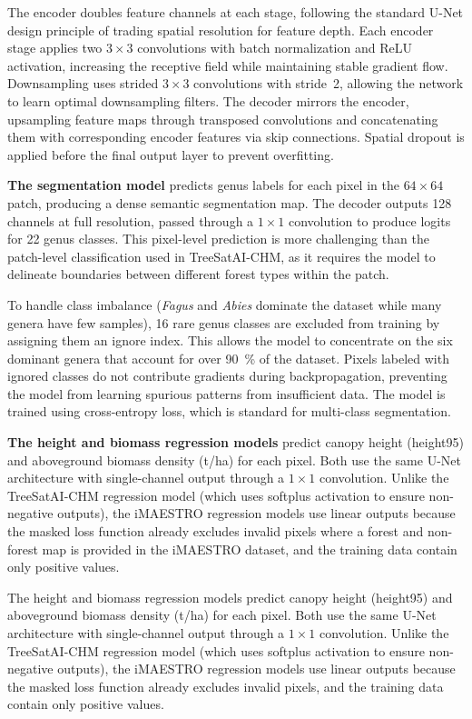 The encoder doubles feature channels at each stage, following the standard U-Net design principle of trading spatial resolution for feature depth. Each encoder stage applies two $3\times 3$ convolutions with batch normalization and ReLU activation, increasing the receptive field while maintaining stable gradient flow. Downsampling uses strided $3\times 3$ convolutions with stride~2, allowing the network to learn optimal downsampling filters. The decoder mirrors the encoder, upsampling feature maps through transposed convolutions and concatenating them with corresponding encoder features via skip connections. Spatial dropout is applied before the final output layer to prevent overfitting.

\textbf{The segmentation model} predicts genus labels for each pixel in the $64\times 64$ patch, producing a dense semantic segmentation map. The decoder outputs 128 channels at full resolution, passed through a $1\times 1$ convolution to produce logits for 22 genus classes. This pixel-level prediction is more challenging than the patch-level classification used in TreeSatAI-CHM, as it requires the model to delineate boundaries between different forest types within the patch.

To handle class imbalance (\textit{Fagus} and \textit{Abies} dominate the dataset while many genera have few samples), 16 rare genus classes are excluded from training by assigning them an ignore index. This allows the model to concentrate on the six dominant genera that account for over \SI{90}{\percent} of the dataset. Pixels labeled with ignored classes do not contribute gradients during backpropagation, preventing the model from learning spurious patterns from insufficient data. The model is trained using cross-entropy loss, which is standard for multi-class segmentation.

\textbf{The height and biomass regression models} predict canopy height (height95) and aboveground biomass density (t/ha) for each pixel. Both use the same U-Net architecture with single-channel output through a $1\times 1$ convolution. Unlike the TreeSatAI-CHM regression model (which uses softplus activation to ensure non-negative outputs), the iMAESTRO regression models use linear outputs because the masked loss function already excludes invalid pixels where a forest and non-forest map is provided in the iMAESTRO dataset, and the training data contain only positive values.

The height and biomass regression models predict canopy height (height95) and aboveground biomass density (t/ha) for each pixel. Both use the same U-Net architecture with single-channel output through a $1\times 1$ convolution. Unlike the TreeSatAI-CHM regression model (which uses softplus activation to ensure non-negative outputs), the iMAESTRO regression models use linear outputs because the masked loss function already excludes invalid pixels, and the training data contain only positive values.

